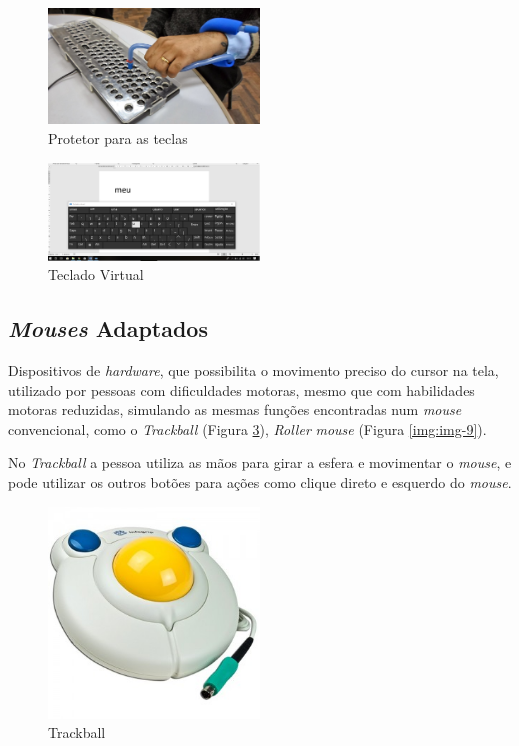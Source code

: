 \documentclass[
	12pt,			%
	openright,		%
	oneside,			%
	a4paper,			%
	chapter=TITLE,		%
	english,			%
	brazil,			%
	]{abntex2}
\begin{document}
\begin{figure}[H]
	\centering
		\includegraphics[width=0.5\textwidth]{./img/img-7.jpg}
		\caption{Protetor para as teclas}
		\label{img:img-7}
\end{figure}

\begin{figure}[H]
	\centering
		\includegraphics[width=0.5\textwidth]{./img/img-6.png}
		\caption{Teclado Virtual}
		\label{img:img-6}
\end{figure}

\subsection{\emph{Mouses} Adaptados}

Dispositivos de \emph{hardware}, que possibilita o movimento preciso do cursor na tela, utilizado por pessoas com dificuldades motoras, mesmo que com habilidades motoras reduzidas, simulando as mesmas funções encontradas num \emph{mouse} convencional, como o \emph{Trackball} (Figura \ref{img:img-8}), \emph{Roller} \emph{mouse} (Figura \ref{img:img-9}).

No \emph{Trackball} a pessoa utiliza as mãos para girar a esfera e movimentar o \emph{mouse}, e pode utilizar os outros botões para ações como clique direto e esquerdo do \emph{mouse}.

\begin{figure}[H]
	\centering
		\includegraphics[width=0.5\textwidth]{./img/img-8.jpg}
		\caption{Trackball}
		\label{img:img-8}
\end{figure}
\end{document}
